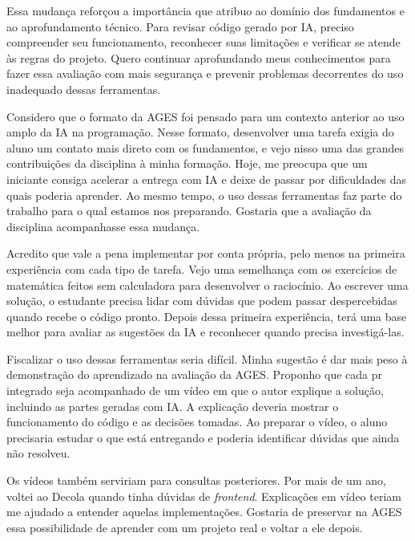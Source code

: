 Essa mudança reforçou a importância que atribuo ao domínio dos fundamentos
e ao aprofundamento técnico. Para revisar código gerado por IA, preciso
compreender seu funcionamento, reconhecer suas limitações e verificar se
atende às regras do projeto. Quero continuar aprofundando meus conhecimentos
para fazer essa avaliação com mais segurança e prevenir problemas
decorrentes do uso inadequado dessas ferramentas.

Considero que o formato da AGES foi pensado para um contexto anterior ao
uso amplo da IA na programação. Nesse formato, desenvolver uma tarefa
exigia do aluno um contato mais direto com os fundamentos, e vejo nisso
uma das grandes contribuições da disciplina à minha formação. Hoje, me
preocupa que um iniciante consiga acelerar a entrega com IA e deixe de
passar por dificuldades das quais poderia aprender. Ao mesmo tempo, o uso
dessas ferramentas faz parte do trabalho para o qual estamos nos preparando.
Gostaria que a avaliação da disciplina acompanhasse essa mudança.

Acredito que vale a pena implementar por conta própria, pelo menos na
primeira experiência com cada tipo de tarefa. Vejo uma semelhança com os
exercícios de matemática feitos sem calculadora para desenvolver o
raciocínio. Ao escrever uma solução, o estudante precisa lidar com dúvidas
que podem passar despercebidas quando recebe o código pronto. Depois dessa
primeira experiência, terá uma base melhor para avaliar as sugestões da IA
e reconhecer quando precisa investigá-las.

Fiscalizar o uso dessas ferramentas seria difícil. Minha sugestão é dar
mais peso à demonstração do aprendizado na avaliação da AGES. Proponho que cada
\ac{pr} integrado seja acompanhado de um vídeo em que o autor explique
a solução, incluindo as partes geradas com IA. A explicação
deveria mostrar o funcionamento do código e as decisões tomadas. Ao preparar o
vídeo, o aluno precisaria estudar o que está entregando e
poderia identificar dúvidas que ainda não resolveu.

Os vídeos também serviriam para consultas posteriores. Por mais de um ano,
voltei ao Decola quando tinha dúvidas de \textit{frontend}. Explicações em
vídeo teriam me ajudado a entender aquelas implementações. Gostaria de
preservar na AGES essa possibilidade de aprender com um projeto real e
voltar a ele depois.
